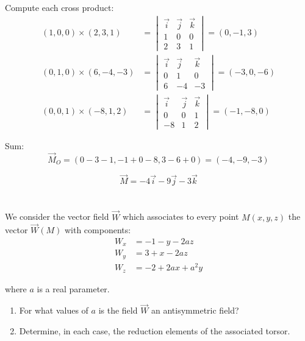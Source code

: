 \documentclass[12pt]{article}
\begin{document}
\begin{correctionbox}
Compute each cross product:
\begin{align*}
(1,0,0) \times (2,3,1) &= 
\begin{vmatrix}
\vec{i} & \vec{j} & \vec{k} \\
1 & 0 & 0 \\
2 & 3 & 1
\end{vmatrix}
= (0, -1, 3) \\
(0,1,0) \times (6,-4,-3) &= 
\begin{vmatrix}
\vec{i} & \vec{j} & \vec{k} \\
0 & 1 & 0 \\
6 & -4 & -3
\end{vmatrix}
= (-3, 0, -6) \\
(0,0,1) \times (-8,1,2) &= 
\begin{vmatrix}
\vec{i} & \vec{j} & \vec{k} \\
0 & 0 & 1 \\
-8 & 1 & 2
\end{vmatrix}
= (-1, -8, 0)
\end{align*}

Sum:
\[
\vec{M}_O = (0-3-1, -1+0-8, 3-6+0) = (-4, -9, -3)
\]

\[
\boxed{\vec{M} = -4\vec{i} - 9\vec{j} - 3\vec{k}}
\]
\end{correctionbox}

\section{}

We consider the vector field $\vec{W}$ which associates to every point $M(x, y, z)$ the vector $\vec{W}(M)$ with components:
\begin{align*}
W_x &= -1 - y - 2az \\
W_y &= 3 + x - 2az \\
W_z &= -2 + 2ax + a^2y
\end{align*}

where $a$ is a real parameter.

\begin{enumerate}
    \item For what values of $a$ is the field $\vec{W}$ an antisymmetric field?
    \item Determine, in each case, the reduction elements of the associated torsor.
\end{enumerate}
\end{document}
